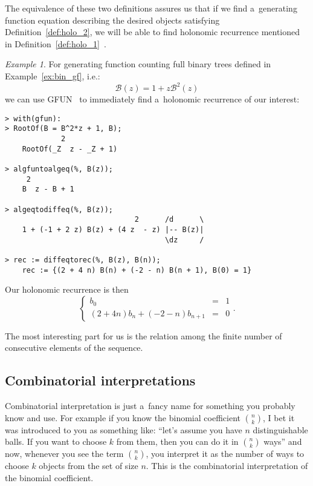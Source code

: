 \documentclass[final]{article}
\theoremstyle{definition}
\theoremstyle{definition}
\theoremstyle{remark}
\newtheorem{example}{Example}[subsection]
\newcommand{\gf}[1]{\ensuremath{\mathcal{#1}}}
\begin{document}
The equivalence of these two definitions assures us that if we find a~generating function equation describing the desired objects satisfying Definition~\ref{def:holo_2}, we will be able to find holonomic recurrence mentioned in Definition~\ref{def:holo_1}~\cite{complexity}.

\begin{example}%
    \label{ex:gfun-rec}
    For generating function counting full binary trees defined in Example~\ref{ex:bin_gf}, i.e.:
    \[\gf{B}(z) = 1 + z\gf{B}^2(z)\]
    we can use GFUN~\cite{gfun} to immediately find a~holonomic recurrence of our interest:

    \begin{lstlisting}
> with(gfun):
> RootOf(B = B^2*z + 1, B);
             2
    RootOf(_Z  z - _Z + 1)

> algfuntoalgeq(%, B(z));
     2
    B  z - B + 1

> algeqtodiffeq(%, B(z));
                              2      /d      \
    1 + (-1 + 2 z) B(z) + (4 z  - z) |-- B(z)|
                                     \dz     /

> rec := diffeqtorec(%, B(z), B(n));
    rec := {(2 + 4 n) B(n) + (-2 - n) B(n + 1), B(0) = 1}
    \end{lstlisting}

    Our holonomic recurrence is then
    \[\left\{\begin{array}{rcl}
                b_0 &=& 1\\
                (2 + 4 n) b_n + (-2 - n) b_{n + 1} &=& 0
    \end{array}\right..\]

    The most interesting part for us is the relation among the finite number of consecutive elements of the sequence.
\end{example}

\subsection{Combinatorial interpretations}%
\label{sub:combinatorial_interpretations}

Combinatorial interpretation is just a~fancy name for something you probably know and use. For example if you know the binomial coefficient \(\binom{n}{k}\), I bet it was introduced to you as something like: ``let's assume you have \(n\) distinguishable balls. If you want to choose \(k\) from them, then you can do it in \(\binom{n}{k}\) ways'' and now, whenever you see the term \(\binom{n}{k}\), you interpret it as the number of ways to choose \(k\) objects from the set of size \(n\). This is the combinatorial interpretation of the binomial coefficient.
\end{document}
